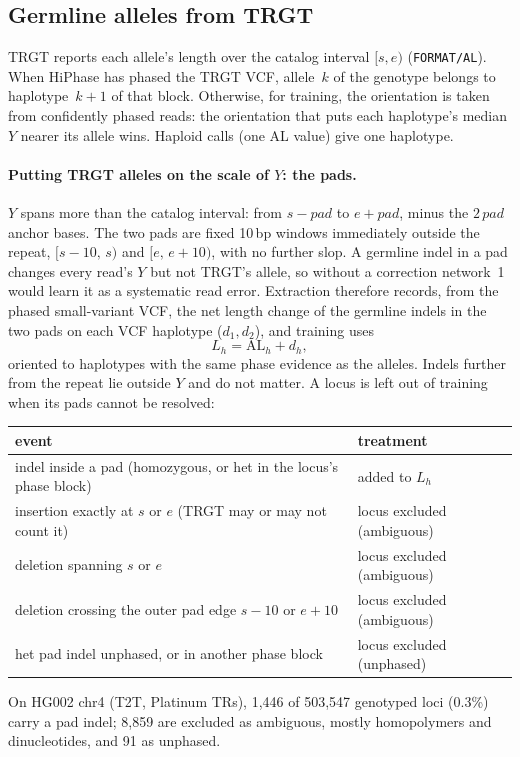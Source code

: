 \documentclass[10pt,a4paper]{article}
\begin{document}
\subsection{Germline alleles from TRGT}
TRGT reports each allele's length over the catalog interval $[s,e)$ (\texttt{FORMAT/AL}). When HiPhase has phased
the TRGT VCF, allele~$k$ of the genotype belongs to haplotype~$k{+}1$ of that block. Otherwise, for training, the
orientation is taken from confidently phased reads: the orientation that puts each haplotype's median $Y$ nearer
its allele wins. Haploid calls (one AL value) give one haplotype.

\paragraph{Putting TRGT alleles on the scale of $Y$: the pads.} $Y$ spans more than the catalog interval: from
$s-\textit{pad}$ to $e+\textit{pad}$, minus the $2\,\textit{pad}$ anchor bases. The two pads are fixed 10\,bp
windows immediately outside the repeat, $[s-10,\,s)$ and $[e,\,e+10)$, with no further slop. A germline indel in
a pad changes every read's $Y$ but not TRGT's allele, so without a correction network~1 would learn it as a
systematic read error. Extraction therefore records, from the phased small-variant VCF, the net length change of
the germline indels in the two pads on each VCF haplotype ($d_1,d_2$), and training uses
\[
L_h = \mathrm{AL}_h + d_h,
\]
oriented to haplotypes with the same phase evidence as the alleles. Indels further from the repeat lie outside
$Y$ and do not matter. A locus is left out of training when its pads cannot be resolved:
\begin{center}\small
\begin{tabular}{@{}ll@{}}
\toprule
event & treatment \\
\midrule
indel inside a pad (homozygous, or het in the locus's phase block) & added to $L_h$ \\
insertion exactly at $s$ or $e$ (TRGT may or may not count it) & locus excluded (ambiguous) \\
deletion spanning $s$ or $e$ & locus excluded (ambiguous) \\
deletion crossing the outer pad edge $s-10$ or $e+10$ & locus excluded (ambiguous) \\
het pad indel unphased, or in another phase block & locus excluded (unphased) \\
\bottomrule
\end{tabular}
\end{center}
On HG002 chr4 (T2T, Platinum TRs), 1{,}446 of 503{,}547 genotyped loci (0.3\%) carry a pad indel; 8{,}859 are
excluded as ambiguous, mostly homopolymers and dinucleotides, and 91 as unphased.
\end{document}
